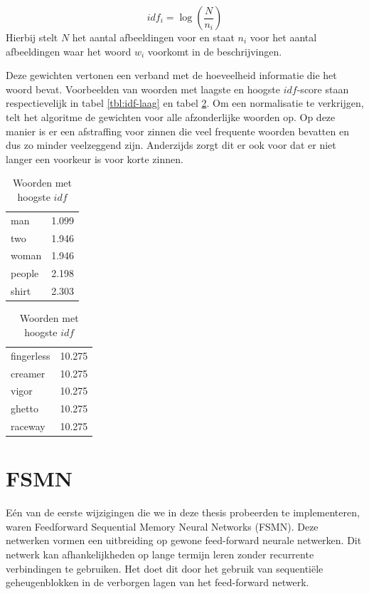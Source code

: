 \begin{equation}
    idf_i = \log(\frac{N}{n_i})
\end{equation}
Hierbij stelt $N$ het aantal afbeeldingen voor en staat $n_i$ voor het aantal afbeeldingen waar het woord $w_i$ voorkomt in de beschrijvingen.

Deze gewichten vertonen een verband met de hoeveelheid informatie die het woord bevat. Voorbeelden van woorden met laagste en hoogste $idf$-score staan respectievelijk in tabel \ref{tbl:idf-laag} en tabel \ref{tbl:idf-hoog}. Om een normalisatie te verkrijgen, telt het algoritme de gewichten voor alle afzonderlijke woorden op. Op deze manier is er een afstraffing voor zinnen die veel frequente woorden bevatten en dus zo minder veelzeggend zijn. Anderzijds zorgt dit er ook voor dat er niet langer een voorkeur is voor korte zinnen.


\begin{table}[!htb]
	\begin{minipage}{.5\linewidth}
		\centering
		\begin{tabular}{ll}
    man    & 1.099 \\
    two    & 1.946 \\
    woman  & 1.946 \\
    people & 2.198 \\
    shirt  & 2.303 \\
		\end{tabular}
		\caption{Woorden met laagste $idf$}
		\label{tbl:idf-laag}
	\end{minipage}%
	\begin{minipage}{.5\linewidth}
		\centering
		
		\begin{tabular}{ll}
	fingerless & 10.275\\
	creamer& 10.275\\
	vigor& 10.275\\
	ghetto& 10.275\\
	raceway& 10.275\\
		\end{tabular}
		\caption{Woorden met hoogste $idf$}
		\label{tbl:idf-hoog}
	\end{minipage} 
\end{table}


\section{FSMN}
E\'en van de eerste wijzigingen die we in deze thesis probeerden te implementeren, waren Feedforward Sequential Memory Neural Networks (FSMN)\cite{Zhang}. Deze netwerken vormen een uitbreiding op gewone feed-forward neurale netwerken. Dit netwerk kan afhankelijkheden op lange termijn leren zonder recurrente verbindingen te gebruiken. Het doet dit door het gebruik van sequenti\"ele geheugenblokken in de verborgen lagen van het feed-forward netwerk. 


